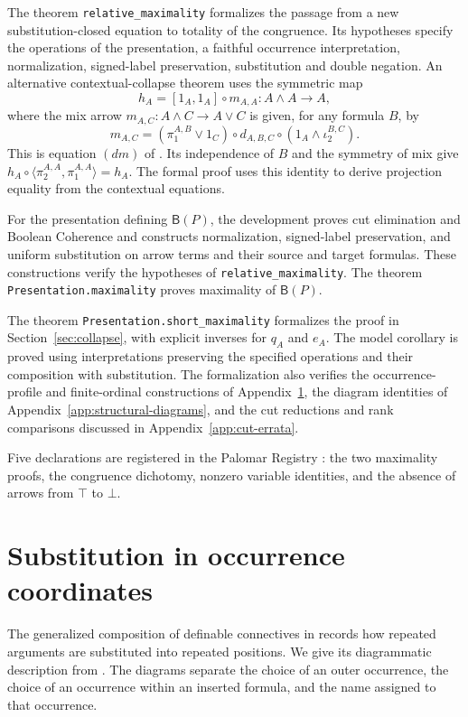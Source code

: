 \documentclass[11pt]{article}
\newcommand{\B}{\mathsf B}
\begin{document}
The theorem \texttt{relative\_maximality} formalizes the passage from a
new substitution-closed equation to totality of the congruence.
Its hypotheses specify the operations of the presentation, a faithful
occurrence interpretation, normalization, signed-label preservation,
substitution and double negation. An alternative contextual-collapse theorem uses the symmetric
map
\[
 h_A=[1_A,1_A]\circ m_{A,A}:A\wedge A\longrightarrow A,
\]
where the mix arrow $m_{A,C}:A\wedge C\to A\vee C$ is given, for any
formula $B$, by
\[
 m_{A,C}=(\pi_1^{A,B}\vee1_C)\circ d_{A,B,C}
              \circ(1_A\wedge\iota_2^{B,C}).
\]
This is equation $(dm)$ of \cite[\S11.1, p.~234]{DP}.
Its independence of $B$ and the symmetry of mix give
$h_A\circ\langle\pi_2^{A,A},\pi_1^{A,A}\rangle=h_A$.
The formal proof uses this identity to derive projection equality
from the contextual equations.

For the presentation defining $\B(P)$, the development proves cut
elimination and Boolean Coherence and constructs normalization,
signed-label preservation, and uniform substitution on arrow terms
and their source and target formulas. These constructions verify the
hypotheses of \texttt{relative\_maximality}. The theorem
\texttt{Presentation.maximality} proves maximality of $\B(P)$.

The theorem \texttt{Presentation.short\_maximality} formalizes the proof
in Section~\ref{sec:collapse}, with explicit inverses for $q_A$ and $e_A$.
The model corollary is proved using interpretations preserving the
specified operations and their composition with substitution. The formalization
also verifies the occurrence-profile and finite-ordinal constructions of
Appendix~\ref{app:substitution}, the diagram identities of
Appendix~\ref{app:structural-diagrams}, and the cut reductions and rank
comparisons discussed in Appendix~\ref{app:cut-errata}.

Five declarations are registered in the Palomar Registry \cite{Palomar}:
the two maximality proofs, the congruence dichotomy, nonzero variable
identities, and the absence of arrows from $\top$ to $\bot$.

\appendix
\section{Substitution in occurrence coordinates}\label{app:substitution}

The generalized composition of definable connectives in
\cite[\S2.5, pp.~45--46]{DP} records how repeated arguments are
substituted into repeated positions. We give its diagrammatic description
from \cite[\S\S9.2--9.3]{Notation}. The diagrams separate the choice of
an outer occurrence, the choice of an occurrence within an inserted
formula, and the name assigned to that occurrence.
\end{document}
